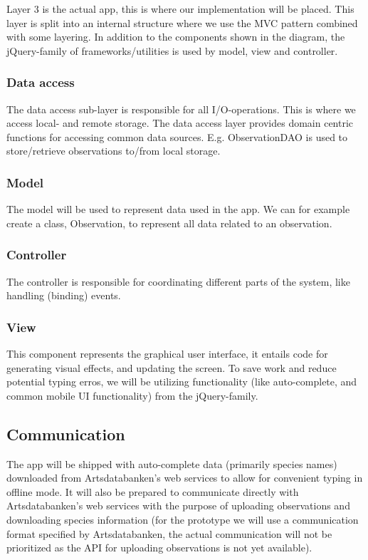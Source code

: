 Layer 3 is the actual app, this is where our implementation will be placed.
This layer is split into an internal structure where we use the MVC pattern combined
with some layering. In addition to the components shown in the diagram, the
jQuery-family of frameworks/utilities is used by model, view and controller.

	\subsubsection{Data access}
	
	The data access sub-layer is responsible for all I/O-operations. This is
	where we access local- and remote storage. The data access layer provides
	domain centric functions for accessing common data sources. E.g.
	ObservationDAO is used to store/retrieve observations to/from local storage.

	\subsubsection{Model}

	The model will be used to represent data used in the app. We can for example
	create a class, Observation, to represent all data related to an
	observation.

	\subsubsection{Controller}

	The controller is responsible for coordinating different parts of the system,
	like handling (binding) events.

	\subsubsection{View}

	This component represents the graphical user interface, it entails code for
	generating visual effects, and updating the screen. To save work and reduce potential typing erros, we will be
	utilizing functionality (like auto-complete, and common mobile UI
	functionality) from the jQuery-family.

\subsection{Communication}

The app will be shipped with auto-complete data (primarily species names)
downloaded from Artsdatabanken's web services to allow for convenient typing in
offline mode. It will also be prepared to communicate directly with
Artsdatabanken's web services with the purpose of uploading observations and
downloading species information (for the prototype we will use a communication
format specified by Artsdatabanken, the actual communication will not be
prioritized as the API for uploading observations is not yet available).
